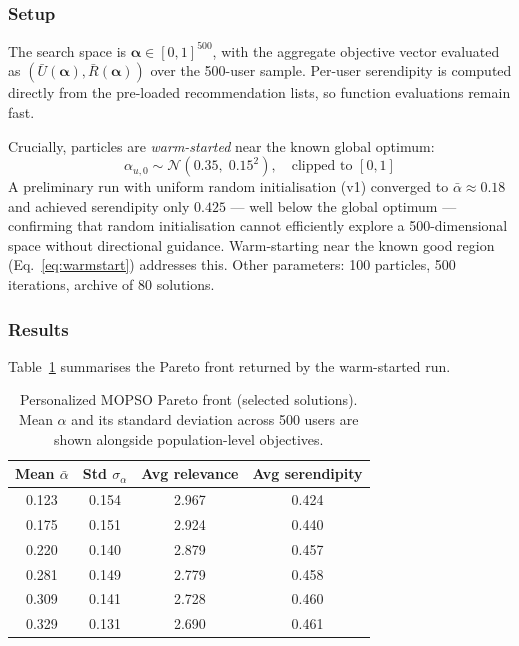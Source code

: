 \subsubsection{Setup}

The search space is $\boldsymbol{\alpha} \in [0,1]^{500}$, with the aggregate
objective vector evaluated as $(\bar{U}(\boldsymbol{\alpha}),
\bar{R}(\boldsymbol{\alpha}))$ over the 500-user sample.  Per-user serendipity
is computed directly from the pre-loaded recommendation lists, so function
evaluations remain fast.

Crucially, particles are \emph{warm-started} near the known global optimum:
\begin{equation}
    \alpha_{u,0} \sim \mathcal{N}(0.35,\; 0.15^2), \quad
    \text{clipped to } [0, 1]
    \label{eq:warmstart}
\end{equation}
A preliminary run with uniform random initialisation (v1) converged to
$\bar{\alpha} \approx 0.18$ and achieved serendipity only $0.425$ ---
well below the global optimum --- confirming that random initialisation
cannot efficiently explore a 500-dimensional space without directional
guidance.  Warm-starting near the known good region (Eq.~\ref{eq:warmstart})
addresses this.  Other parameters: 100 particles, 500 iterations, archive
of 80 solutions.

\subsubsection{Results}

Table~\ref{tab:exp3b_front} summarises the Pareto front returned by the
warm-started run.

\begin{table}[h]
\centering
\caption{Personalized MOPSO Pareto front (selected solutions).
         Mean $\alpha$ and its standard deviation across 500 users are
         shown alongside population-level objectives.}
\label{tab:exp3b_front}
\begin{tabular}{cccc}
\toprule
\textbf{Mean $\bar{\alpha}$} & \textbf{Std $\sigma_\alpha$} &
\textbf{Avg relevance} & \textbf{Avg serendipity} \\
\midrule
0.123 & 0.154 & 2.967 & 0.424 \\
0.175 & 0.151 & 2.924 & 0.440 \\
0.220 & 0.140 & 2.879 & 0.457 \\
0.281 & 0.149 & 2.779 & 0.458 \\
0.309 & 0.141 & 2.728 & 0.460 \\
0.329 & 0.131 & 2.690 & 0.461 \\
\bottomrule
\end{tabular}
\end{table}

